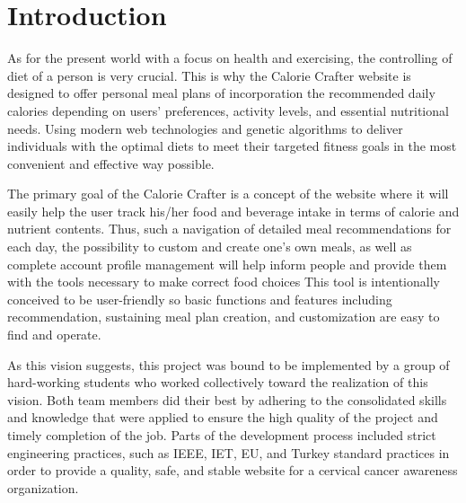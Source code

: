 \documentclass[a4paper,12pt]{article}
\begin{document}
\maketitle

\makeabstract

\maketableofcontents

\newpage
{} %
\setcounter{page}{1} %

\section{Introduction}
{\small

As for the present world with a focus on health and exercising, the controlling of diet of a person is very crucial. This is why the Calorie Crafter website is designed to offer personal meal plans of incorporation the recommended daily calories depending on users’ preferences, activity levels, and essential nutritional needs. Using modern web technologies and genetic algorithms to deliver individuals with the optimal diets to meet their targeted fitness goals in the most convenient and effective way possible.

The primary goal of the Calorie Crafter is a concept of the website where it will easily help the user track his/her food and beverage intake in terms of calorie and nutrient contents. Thus, such a navigation of detailed meal recommendations for each day, the possibility to custom and create one’s own meals, as well as complete account profile management will help inform people and provide them with the tools necessary to make correct food choices This tool is intentionally conceived to be user-friendly so basic functions and features including recommendation, sustaining meal plan creation, and customization are easy to find and operate.

As this vision suggests, this project was bound to be implemented by a group of hard-working students who worked collectively toward the realization of this vision. Both team members did their best by adhering to the consolidated skills and knowledge that were applied to ensure the high quality of the project and timely completion of the job. Parts of the development process included strict engineering practices, such as IEEE, IET, EU, and Turkey standard practices in order to provide a quality, safe, and stable website for a cervical cancer awareness organization.

}
\end{document}
